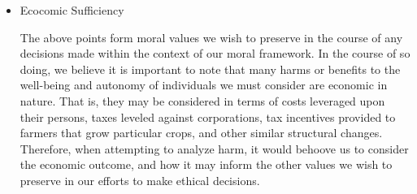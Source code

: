\begin{itemize}
  \item Ecocomic Sufficiency
    \begin{pointenv}
      The above points form moral values we wish to preserve in the 
      course of any decisions made within the context of our moral framework.  
      In the course of so doing, we believe it is important to note that 
      many harms or benefits to the well-being and autonomy of individuals 
      we must consider are economic in nature.  That is, they may be 
      considered in terms of costs leveraged upon their persons, taxes 
      leveled against corporations, tax incentives provided to 
      farmers that grow particular crops, and other similar structural 
      changes.  Therefore, when attempting to analyze harm, it would 
      behoove us to consider the economic outcome, and how it may inform 
      the other values we wish to preserve in our efforts to make 
      ethical decisions.
    \end{pointenv}
\end{itemize}

